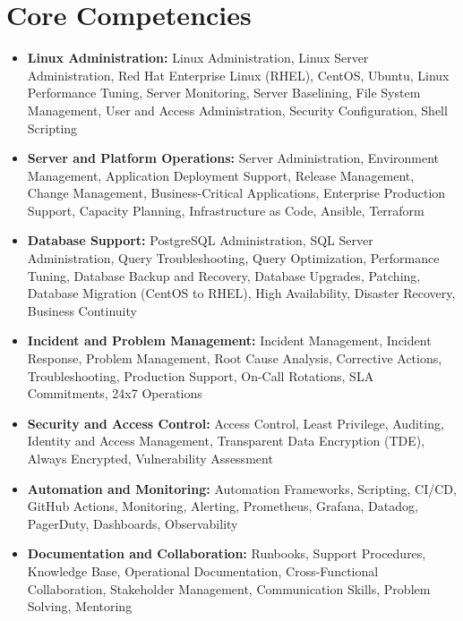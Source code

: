 \documentclass[10pt,a4paper]{article}
\begin{document}
\section{Core Competencies}
\begin{itemize}
  \item \textbf{Linux Administration:} Linux Administration, Linux Server Administration, Red Hat Enterprise Linux (RHEL), CentOS, Ubuntu, Linux Performance Tuning, Server Monitoring, Server Baselining, File System Management, User and Access Administration, Security Configuration, Shell Scripting
  \item \textbf{Server and Platform Operations:} Server Administration, Environment Management, Application Deployment Support, Release Management, Change Management, Business-Critical Applications, Enterprise Production Support, Capacity Planning, Infrastructure as Code, Ansible, Terraform
  \item \textbf{Database Support:} PostgreSQL Administration, SQL Server Administration, Query Troubleshooting, Query Optimization, Performance Tuning, Database Backup and Recovery, Database Upgrades, Patching, Database Migration (CentOS to RHEL), High Availability, Disaster Recovery, Business Continuity
  \item \textbf{Incident and Problem Management:} Incident Management, Incident Response, Problem Management, Root Cause Analysis, Corrective Actions, Troubleshooting, Production Support, On-Call Rotations, SLA Commitments, 24x7 Operations
  \item \textbf{Security and Access Control:} Access Control, Least Privilege, Auditing, Identity and Access Management, Transparent Data Encryption (TDE), Always Encrypted, Vulnerability Assessment
  \item \textbf{Automation and Monitoring:} Automation Frameworks, Scripting, CI/CD, GitHub Actions, Monitoring, Alerting, Prometheus, Grafana, Datadog, PagerDuty, Dashboards, Observability
  \item \textbf{Documentation and Collaboration:} Runbooks, Support Procedures, Knowledge Base, Operational Documentation, Cross-Functional Collaboration, Stakeholder Management, Communication Skills, Problem Solving, Mentoring
\end{itemize}
\end{document}
